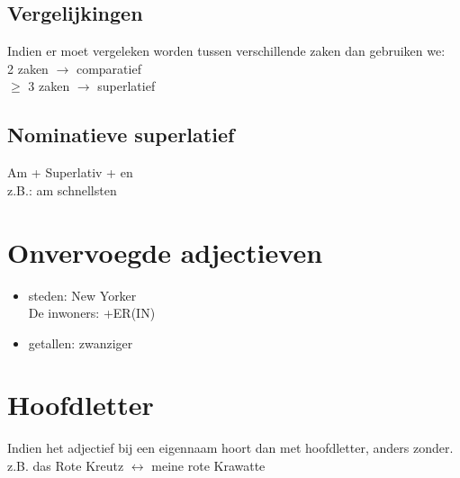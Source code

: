 \documentclass[main.tex]{subfiles}
\begin{document}
\subsection{Vergelijkingen}
Indien er moet vergeleken worden tussen verschillende zaken dan gebruiken we:\\
2 zaken $\rightarrow$ comparatief\\
$\geq$ 3 zaken $\rightarrow$ superlatief

\subsection{Nominatieve superlatief}
Am + Superlativ + en\\
z.B.: am schnellsten

\section{Onvervoegde adjectieven}
\begin{itemize}
\item steden: New Yorker \\
De inwoners: +ER(IN)
\item getallen: zwanziger
\end{itemize}

\section{Hoofdletter}
Indien het adjectief bij een eigennaam hoort dan met hoofdletter, anders zonder.\\
z.B. das Rote Kreutz $\leftrightarrow$ meine rote Krawatte
\end{document}
